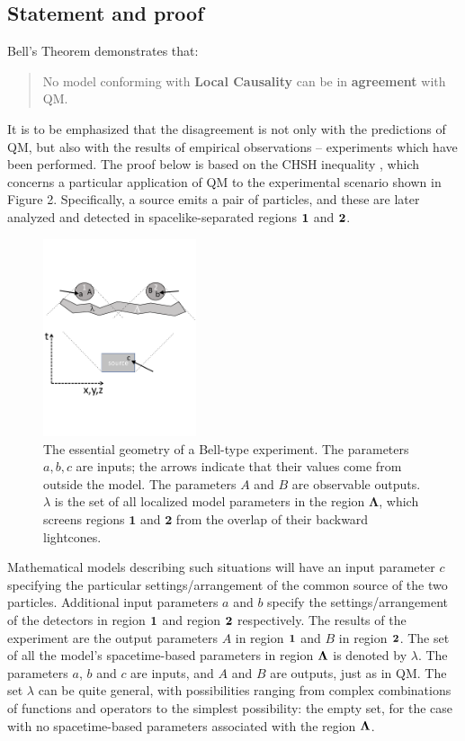 \documentclass[rmp, aps, preprint, longbibliography]{revtex4-1}
\begin{document}
\subsection{Statement and proof}
\label{sec:theorem}

Bell's Theorem demonstrates that:
\begin{quote} 
No model conforming with {\bf Local Causality} can be in {\bf agreement} with QM.
\end{quote}
It is to be emphasized that the disagreement is not only with the predictions of QM, but also with the results of empirical observations -- experiments which have been performed.  The proof below is based on the CHSH inequality \cite{clauser1969}, which concerns a particular application of QM to the experimental scenario shown in Figure 2.  Specifically, a source emits a pair of particles, and these are later analyzed and detected in spacelike-separated regions $\bf{1}$ and $\bf{2}$.

\begin{figure}[t]%
\centerline{\includegraphics[width=0.4\textwidth]{Figure2.pdf}}
\label{Figure:Fig2}
\caption{The essential geometry of a Bell-type experiment.  The parameters $a,b,c$ are inputs; the arrows indicate that their values come from outside the model.  The parameters $A$ and $B$ are observable outputs. $\lambda$ is the set of all localized model parameters in the region $\bm{\Lambda}$, which screens regions $\bm{1}$ and $\bm{2}$ from the overlap of their backward lightcones.}
\end{figure}

Mathematical models describing such situations will have an input parameter $c$ specifying the particular settings/arrangement of the common source of the two particles.  Additional input parameters $a$ and $b$ specify the settings/arrangement of the detectors in region $\bf{1}$ and region $\bf{2}$ respectively.  The results of the experiment are the output parameters $A$ in region $\bf{1}$ and $B$ in region $\bf{2}$.  The set of all the model's spacetime-based parameters in region $\bf{\Lambda}$ is denoted by $\lambda$.  The parameters $a$, $b$ and $c$ are inputs, and $A$ and $B$ are outputs, just as in QM\@.  The set $\lambda$ can be quite general, with possibilities ranging from complex combinations of functions and operators to the simplest possibility: the empty set, for the case with no spacetime-based parameters associated with the region $\bf{\Lambda}$.
\end{document}
